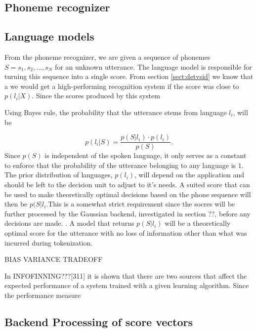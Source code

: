 \subsection{Phoneme recognizer}
\label{sect:phnrec}




\subsection{Language models}
\label{sect:basiclangmodel}

From the phoneme recognizer, we are given a sequence of phonemes $S = s_1, s_2, ... , s_N$ for an unknown utterance. The language model is responsible for turning this sequence into a single score. From section \ref{sect:detvsid} we know that a we would get a high-performing recognition system if the score was close to $p(l_i|X)$. Since the scores produced by this system


Using Bayes rule, the probability that the utterance stems from language $l_i$, will be

\begin{equation}
\label{basebayes}
p(l_i|S) = \frac{p(S|l_i) \cdot p(l_i)}{p(S)}.
\end{equation}
Since $p(S)$ is independent of the spoken language, it only serves as a constant to enforce that the probability of the utterance belonging to any language is $1$. The prior distribution of languages, $p(l_i)$, will depend on the application and should be left to the decision unit to adjust to it's needs. A suited score that can be used to make theoretically optimal decisions based on the phone sequence will then be $p(S|l_i$.This is a somewhat strict requirement since the socres will be further processed by the Gaussian backend, investigated in section ??, before any decisions are made. . A model that returns $p(S|l_i)$ will be a theoretically optimal score for the utterance with no loss of information other than what was incurred during tokenization.

BIAS VARIANCE TRADEOFF

In INFOFINNING???[311] it is shown that there are two sources that affect the expected performance of a system trained with a given learning algorithm. Since the performance measure

\subsection{Backend Processing of score vectors}
\label{sect:backendscoring}


